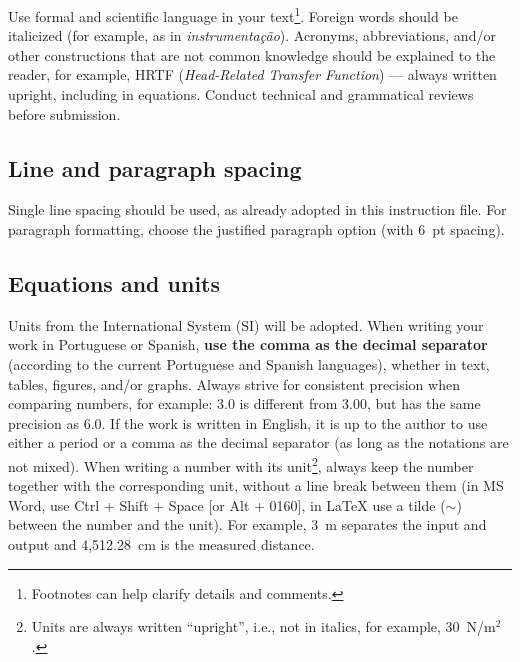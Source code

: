 
Use formal and scientific language in your text\footnote{Footnotes can help clarify details and comments.}. Foreign words should be italicized (for example, as in \textit{instrumentação}). Acronyms, abbreviations, and/or other constructions that are not common knowledge should be explained to the reader, for example, HRTF (\textit{Head-Related Transfer Function}) --- always written upright, including in equations.
Conduct technical and grammatical reviews before submission.

\subsection{Line and paragraph spacing}

Single line spacing should be used, as already adopted in this instruction file. For paragraph formatting, choose the justified paragraph option (with 6~pt spacing).


\subsection{Equations and units}

Units from the International System (SI) will be adopted. When writing your work in Portuguese or Spanish, \textbf{use the comma as the decimal separator} (according to the current Portuguese and Spanish languages), whether in text, tables, figures, and/or graphs. Always strive for consistent precision when comparing numbers, for example: 3.0 is different from 3.00, but has the same precision as 6.0.
If the work is written in English, it is up to the author to use either a period or a comma as the decimal separator (as long as the notations are not mixed).
When writing a number with its unit\footnote{Units are always written ``upright'', i.e., not in italics, for example, 30~N/m$^2$.}, always keep the number together with the corresponding unit, without a line break between them (in MS Word, use Ctrl + Shift + Space [or Alt + 0160], in \LaTeX\xspace use a tilde ($\sim$) between the number and the unit). For example, 3~m separates the input and output and 4,512.28~cm is the measured distance.

